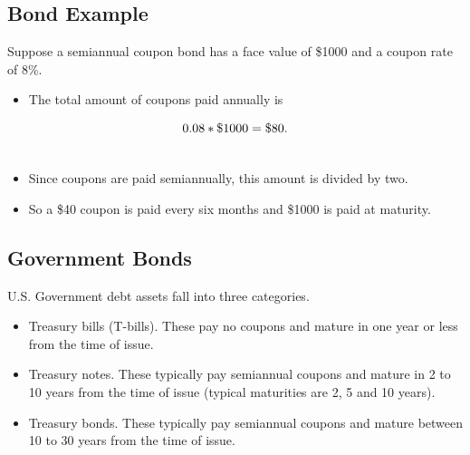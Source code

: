 \documentclass[letterpaper,10pt,english]{sphinxmanual}
\begin{document}
\subsection{Bond Example}
\label{bondPrices:bond-example}
Suppose a semiannual coupon bond has a face value of \$1000 and a
coupon rate of 8\%.
\begin{itemize}
\item {} 
The total amount of coupons paid annually is

\end{itemize}
\begin{gather}
\begin{split}0.08*\$1000 = \$80.\end{split}\notag\\\begin{split}\end{split}\notag
\end{gather}\begin{itemize}
\item {} 
Since coupons are paid semiannually, this amount is divided by two.

\end{itemize}
\begin{itemize}
\item {} 
So a \$40 coupon is paid every six months and \$1000 is paid at
maturity.

\end{itemize}


\subsection{Government Bonds}
\label{bondPrices:government-bonds}
U.S. Government debt assets fall into three categories.
\begin{itemize}
\item {} 
Treasury bills (T-bills). These pay no coupons and mature in one
year or less from the time of issue.

\end{itemize}
\begin{itemize}
\item {} 
Treasury notes. These typically pay semiannual coupons and mature in
2 to 10 years from the time of issue (typical maturities are 2, 5
and 10 years).

\end{itemize}
\begin{itemize}
\item {} 
Treasury bonds. These typically pay semiannual coupons and mature
between 10 to 30 years from the time of issue.

\end{itemize}
\end{document}
